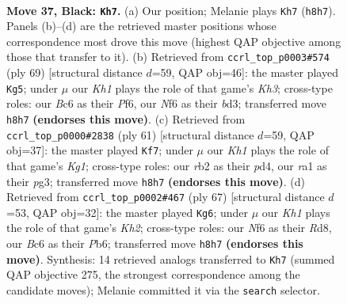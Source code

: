 \documentclass[11pt]{article}
\begin{document}
\clearpage

\begin{figure}[p]\centering
\begin{subfigure}{0.46\textwidth}\centering
\resizebox{\linewidth}{!}{%
\newchessgame
\chessboard[
  setfen={2r4k/p5p1/P1bb1n1p/1p3p2/1P3P2/4P1P1/1R6/RNB3K1 b - - 4 37},
  showmover=false,
  pgfstyle=straightmove, color=movearrow, markmove={h8-h7}
]}
\caption{}
\end{subfigure}\hfill
\begin{subfigure}{0.46\textwidth}\centering
\resizebox{\linewidth}{!}{%
\newchessgame
\chessboard[
  setfen={7r/5p2/2p2p1k/4pP2/p2bP3/3B4/PPR2PK1/8 b - - 0 35},
  showmover=false,
  pgfstyle=straightmove, color=movearrow, markmove={h6-g5}
]}
\caption{}
\end{subfigure}
\\[4pt]
\begin{subfigure}{0.46\textwidth}\centering
\resizebox{\linewidth}{!}{%
\newchessgame
\chessboard[
  setfen={r5k1/1p5p/2b5/p4p2/P2P2p1/2B3P1/1P3P1P/R4K2 b - - 0 31},
  showmover=false,
  pgfstyle=straightmove, color=movearrow, markmove={g8-f7}
]}
\caption{}
\end{subfigure}\hfill
\begin{subfigure}{0.46\textwidth}\centering
\resizebox{\linewidth}{!}{%
\newchessgame
\chessboard[
  setfen={3r4/3b2pk/pp1P3p/2pB2p1/P5P1/1P1R3P/5P2/6K1 b - - 0 34},
  showmover=false,
  pgfstyle=straightmove, color=movearrow, markmove={h7-g6}
]}
\caption{}
\end{subfigure}
\caption{\textbf{Move 37, Black: \texttt{Kh7}.} (a) Our position; Melanie plays \texttt{Kh7} (\texttt{h8h7}). Panels (b)--(d) are the retrieved master positions whose correspondence most drove this move (highest QAP objective among those that transfer to it). (b) Retrieved from \texttt{ccrl\_top\_p0003\#574} (ply 69) [structural distance $d$=59, QAP obj=46]: the master played \texttt{Kg5}; under $\mu$ our \emph{Kh1} plays the role of that game's \emph{Kh3}; cross-type roles: our \emph{B}c6 as their \emph{P}f6, our \emph{N}f6 as their \emph{b}d3; transferred move \texttt{h8h7} \textbf{(endorses this move)}. (c) Retrieved from \texttt{ccrl\_top\_p0000\#2838} (ply 61) [structural distance $d$=59, QAP obj=37]: the master played \texttt{Kf7}; under $\mu$ our \emph{Kh1} plays the role of that game's \emph{Kg1}; cross-type roles: our \emph{r}b2 as their \emph{p}d4, our \emph{r}a1 as their \emph{p}g3; transferred move \texttt{h8h7} \textbf{(endorses this move)}. (d) Retrieved from \texttt{ccrl\_top\_p0002\#467} (ply 67) [structural distance $d$=53, QAP obj=32]: the master played \texttt{Kg6}; under $\mu$ our \emph{Kh1} plays the role of that game's \emph{Kh2}; cross-type roles: our \emph{N}f6 as their \emph{R}d8, our \emph{B}c6 as their \emph{P}b6; transferred move \texttt{h8h7} \textbf{(endorses this move)}. Synthesis: 14 retrieved analogs transferred to \texttt{Kh7} (summed QAP objective 275, the strongest correspondence among the candidate moves); Melanie committed it via the \texttt{search} selector.}
\label{fig:thought-m73}
\end{figure}
\end{document}
